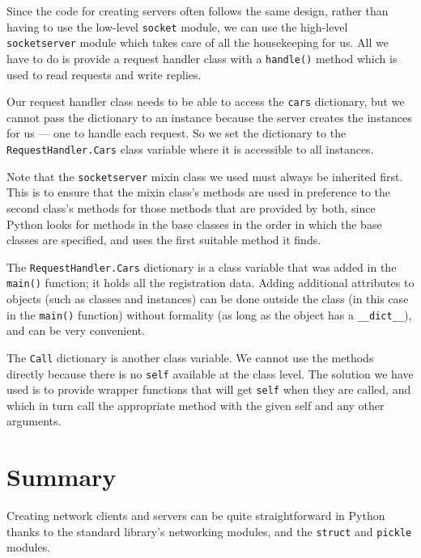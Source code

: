 Since the code for creating servers often follows the same design, rather than having to use the low-level \verb|socket| module, we can use the high-level \verb|socketserver| module which takes care of all the housekeeping for us.
All we have to do is provide a request handler class with a \verb|handle()| method which is used to read requests and write replies.


Our request handler class needs to be able to access the \verb|cars| dictionary, but we cannot pass the dictionary to an instance because the server creates the instances for us --- one to handle each request.
So we set the dictionary to the \verb|RequestHandler.Cars| class variable where it is accessible to all instances.



Note that the \verb|socketserver| mixin class we used must always be inherited first.
This is to ensure that the mixin class’s methods are used in preference to the second class’s methods for those methods that are provided by both, since Python looks for methods in the base classes in the order in which the base classes are specified, and uses the first suitable method it finds.


The \verb|RequestHandler.Cars| dictionary is a class variable that was added in the \verb|main()| function; it holds all the registration data.
Adding additional attributes to objects (such as classes and instances) can be done outside the class (in this case in the \verb|main()| function) without formality (as long as the object has a \verb|__dict__|), and can be very convenient.


The \verb|Call| dictionary is another class variable.
We cannot use the methods directly because there is no \verb|self| available at the class level.
The solution we have used is to provide wrapper functions that will get \verb|self| when they are called, and which in turn call the appropriate method with the given self and any other arguments.


\section{Summary}

Creating network clients and servers can be quite straightforward in Python thanks to the standard library’s networking modules, and the \verb|struct| and \verb|pickle| modules.



